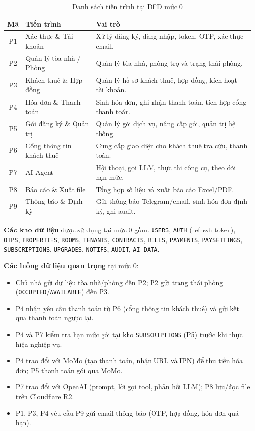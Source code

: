 \documentclass[12pt,a4paper]{report}
\begin{document}
\begin{table}[H]
  \centering
  \caption{Danh sách tiến trình tại DFD mức 0}
  \label{tab:process0}
  \begin{tabular}{@{}c p{4.4cm} p{8.6cm}@{}}
    \toprule
    \textbf{Mã} & \textbf{Tiến trình} & \textbf{Vai trò} \\
    \midrule
    P1 & Xác thực \& Tài khoản & Xử lý đăng ký, đăng nhập, token, OTP, xác thực email. \\
    P2 & Quản lý tòa nhà / Phòng & Quản lý tòa nhà, phòng trọ và trạng thái phòng. \\
    P3 & Khách thuê \& Hợp đồng & Quản lý hồ sơ khách thuê, hợp đồng, kích hoạt tài khoản. \\
    P4 & Hóa đơn \& Thanh toán & Sinh hóa đơn, ghi nhận thanh toán, tích hợp cổng thanh toán. \\
    P5 & Gói đăng ký \& Quản trị & Quản lý gói dịch vụ, nâng cấp gói, quản trị hệ thống. \\
    P6 & Cổng thông tin khách thuê & Cung cấp giao diện cho khách thuê tra cứu, thanh toán. \\
    P7 & AI Agent & Hội thoại, gọi LLM, thực thi công cụ, theo dõi hạn mức. \\
    P8 & Báo cáo \& Xuất file & Tổng hợp số liệu và xuất báo cáo Excel/PDF. \\
    P9 & Thông báo \& Định kỳ & Gửi thông báo Telegram/email, sinh hóa đơn định kỳ, ghi audit. \\
    \bottomrule
  \end{tabular}
\end{table}

\textbf{Các kho dữ liệu} được sử dụng tại mức 0 gồm: \texttt{USERS}, \texttt{AUTH} (refresh token), \texttt{OTPS}, \texttt{PROPERTIES}, \texttt{ROOMS}, \texttt{TENANTS}, \texttt{CONTRACTS}, \texttt{BILLS}, \texttt{PAYMENTS}, \texttt{PAYSETTINGS}, \texttt{SUBSCRIPTIONS}, \texttt{UPGRADES}, \texttt{NOTIFS}, \texttt{AUDIT}, \texttt{AI DATA}.

\textbf{Các luồng dữ liệu quan trọng} tại mức 0:

\begin{itemize}[leftmargin=1.2em,itemsep=2pt]
  \item Chủ nhà gửi dữ liệu tòa nhà/phòng đến P2; P2 gửi trạng thái phòng (\texttt{OCCUPIED}/\texttt{AVAILABLE}) đến P3.
  \item P4 nhận yêu cầu thanh toán từ P6 (cổng thông tin khách thuê) và gửi kết quả thanh toán ngược lại.
  \item P4 và P7 kiểm tra hạn mức gói tại kho \texttt{SUBSCRIPTIONS} (P5) trước khi thực hiện nghiệp vụ.
  \item P4 trao đổi với MoMo (tạo thanh toán, nhận URL và IPN) để thu tiền hóa đơn; P5 thanh toán gói qua MoMo.
  \item P7 trao đổi với OpenAI (prompt, lời gọi tool, phản hồi LLM); P8 lưu/đọc file trên Cloudflare R2.
  \item P1, P3, P4 yêu cầu P9 gửi email thông báo (OTP, hợp đồng, hóa đơn quá hạn).
\end{itemize}
\end{document}
